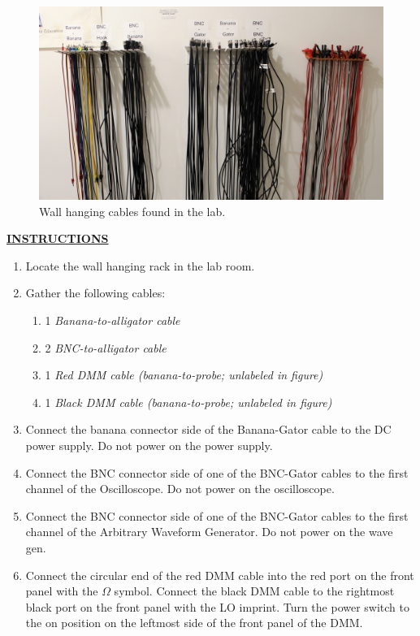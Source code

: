 \documentclass[12pt]{article}
\begin{document}
\begin{figure}[H]
    \centering
    \includegraphics[width=15cm]{photos/lab/wallcables.jpg}
    \caption{Wall hanging cables found in the lab.}
\end{figure}

\textbf{\underline{INSTRUCTIONS}}

\begin{enumerate}
    \item Locate the wall hanging rack in the lab room.
    \item Gather the following cables: 
    \begin{enumerate}
        \item 1 \textit{Banana-to-alligator cable}
        \item 2 \textit{BNC-to-alligator cable}
        \item 1 \textit{Red DMM cable (banana-to-probe; unlabeled in figure)} 
        \item 1 \textit{Black DMM cable (banana-to-probe; unlabeled in figure)}
    \end{enumerate}
    \item Connect the banana connector side of the Banana-Gator cable to the DC power supply. Do not power on the power supply.
    \item Connect the BNC connector side of one of the BNC-Gator cables to the first channel of the Oscilloscope. Do not power on the oscilloscope.
    \item Connect the BNC connector side of one of the BNC-Gator cables to the first channel of the Arbitrary Waveform Generator. Do not power on the wave gen.
    \item Connect the circular end of the red DMM cable into the red port on the front panel with the $\Omega$ symbol. Connect the black DMM cable to the rightmost black port on the front panel with the LO imprint. Turn the power switch to the on  position on the leftmost side of the front panel of the DMM.
\end{enumerate}
\end{document}
